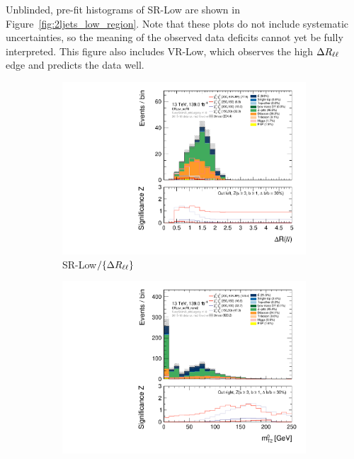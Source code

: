 Unblinded, pre-fit histograms of SR-Low are shown in
Figure~\ref{fig:2ljets_low_region}.
Note that these plots do not include systematic uncertainties, so the meaning
of the observed data deficits cannot yet be fully interpreted.
This figure also includes VR-Low, which observes the high $\Delta R_{\ell\ell}$ edge and
predicts the data well.

\begin{figure}[tp]
\centering
\begin{subfigure}{0.48\textwidth}
\centering
\includegraphics[width=\textwidth]{figures/2ljets_low_Rll_SRLow_noRll.pdf}
\caption{SR-Low$/\{\Delta R_{\ell\ell}\}$}
\end{subfigure}
\hfill
\begin{subfigure}{0.48\textwidth}
\centering
\includegraphics[width=\textwidth]{figures/2ljets_low_mt2leplsp_0_SRLow_noRll_nomt2.pdf}

\end{subfigure}
\end{figure}
